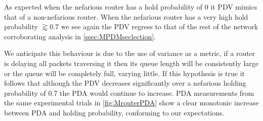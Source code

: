 As expected when the nefarious router has a hold probability of 0 it PDV mimics that of a non-nefarious router. When the nefarious router has a very high hold probability $\gtrapprox 0.7$ we see again the PDV regress to that of the rest of the network corroborating analysis in \cref{ssec:MPDMseclection}.\par
We anticipate this behaviour is due to the use of variance as a metric, if a router is delaying all packets traversing it then its queue length will be consistently large or the queue will be completely full, varying little. If this hypothesis is true it follows that although the PDV decreases significantly over a nefarious holding probability of 0.7 the PDA would continue to increase. PDA measurements from the same experimental trials in \ref{fig:MrouterPDA} show a clear monotonic increase between PDA and holding probability, conforming to our expectations.

